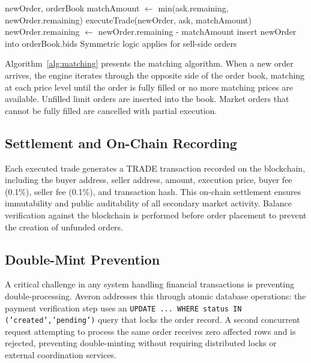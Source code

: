 \documentclass[conference]{IEEEtran}
\begin{document}
\begin{algorithm}[t]
\caption{Price-Time Priority Order Matching}
\label{alg:matching}
\begin{algorithmic}[1]
\REQUIRE newOrder, orderBook
            \STATE matchAmount $\gets$ min(ask.remaining, newOrder.remaining)
            \STATE executeTrade(newOrder, ask, matchAmount)
            \STATE newOrder.remaining $\gets$ newOrder.remaining - matchAmount
             \RETURN \ENDIF
        \ENDIF
    \ENDFOR
        \STATE insert newOrder into orderBook.bids
    \ENDIF
\ELSE
    \STATE Symmetric logic applies for sell-side orders
\ENDIF
\end{algorithmic}
\end{algorithm}

Algorithm~\ref{alg:matching} presents the matching algorithm. When a new order arrives, the engine iterates through the opposite side of the order book, matching at each price level until the order is fully filled or no more matching prices are available. Unfilled limit orders are inserted into the book. Market orders that cannot be fully filled are cancelled with partial execution.

\subsection{Settlement and On-Chain Recording}

Each executed trade generates a TRADE transaction recorded on the blockchain, including the buyer address, seller address, amount, execution price, buyer fee (0.1\%), seller fee (0.1\%), and transaction hash. This on-chain settlement ensures immutability and public auditability of all secondary market activity. Balance verification against the blockchain is performed before order placement to prevent the creation of unfunded orders.

\subsection{Double-Mint Prevention}

A critical challenge in any system handling financial transactions is preventing double-processing. Averon addresses this through atomic database operations: the payment verification step uses an \texttt{UPDATE ... WHERE status IN ('created','pending')} query that locks the order record. A second concurrent request attempting to process the same order receives zero affected rows and is rejected, preventing double-minting without requiring distributed locks or external coordination services.
\end{document}
